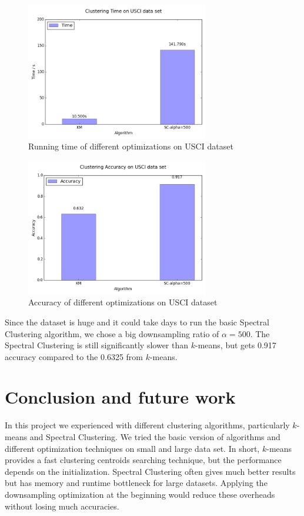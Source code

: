 \documentclass{acm_proc_article-sp}
\begin{document}
\begin{figure}
\centering
\includegraphics[height=6cm]{ut.png}
\caption{Running time of different optimizations on USCI dataset}
\label{figure_usci_time}
\end{figure}

\begin{figure}[h]
\centering
\includegraphics[height=6cm]{ua.png}
\caption{Accuracy of different optimizations on USCI dataset}
\label{figure_usci_accu}
\end{figure}

Since the dataset is huge and it could take days to run the basic Spectral Clustering algorithm, we chose a big downsampling ratio of $\alpha = 500$. The Spectral Clustering is still significantly slower than $k$-means, but gets 0.917 accuracy compared to the 0.6325 from $k$-means.

\section{Conclusion and future work}

In this project we experienced with different clustering algorithms, particularly $k$-means and Spectral Clustering. We tried the basic version of algorithms and different optimization techniques on small and large data set. In short, $k$-means provides a fast clustering centroids searching technique, but the performance depends on the initialization. Spectral Clustering often gives much better results but has memory and runtime bottleneck for large datasets. Applying the downsampling optimization at the beginning would reduce these overheads without losing much accuracies.  
\end{document}
